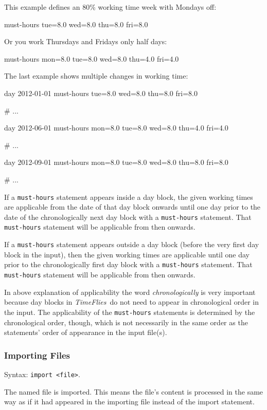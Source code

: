 \documentclass[11pt]{article}
\newcommand{\timeflies}{\emph{TimeFlies}}
\begin{document}
This example defines an 80\% working time week with Mondays off:
\begin{inputfile}
must-hours tue=8.0 wed=8.0 thu=8.0 fri=8.0
\end{inputfile}

Or you work Thursdays and Fridays only half days:
\begin{inputfile}
must-hours mon=8.0 tue=8.0 wed=8.0 thu=4.0 fri=4.0
\end{inputfile}

The last example shows multiple changes in working time: 
\begin{inputfile}
day 2012-01-01
must-hours tue=8.0 wed=8.0 thu=8.0 fri=8.0

# ...

day 2012-06-01
must-hours mon=8.0 tue=8.0 wed=8.0 thu=4.0 fri=4.0

# ...

day 2012-09-01
must-hours mon=8.0 tue=8.0 wed=8.0 thu=8.0 fri=8.0

# ...
\end{inputfile}


If a \verb:must-hours: statement appears inside a day block, the given working times are applicable from the date of that day block onwards until one day prior to the date of the chronologically next day block with a \verb:must-hours: statement. That \verb:must-hours: statement will be applicable from then onwards.

If a \verb:must-hours: statement appears outside a day block (before the very first day block in the input), then the given working times are applicable until one day prior to the chronologically first day block with a \verb:must-hours: statement. That \verb:must-hours: statement will be applicable from then onwards.

In above explanation of applicability the word \emph{chronologically} is very important because day blocks in \timeflies\ do not need to appear in chronological order in the input. The applicability of the \verb:must-hours: statements is determined by the chronological order, though, which is not necessarily in the same order as the statements' order of appearance in the input file(s).

\subsubsection{Importing Files}

Syntax: \verb:import <file>:.

The named file is imported. This means the file's content is processed in the same way as if it had appeared in the importing file instead of the import statement.
\end{document}
